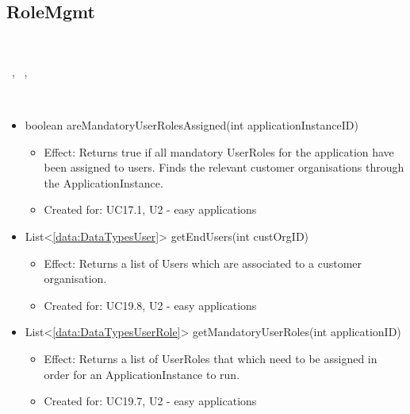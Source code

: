   \subsection{RoleMgmt}\label{int:OnlineServiceOnlineServiceUserManagerRoleMgmt}
    \begin{description}
      \item[Provided by:] \iconcomponent{}~
      \item[Required by:] \iconcomponent{}~, \iconcomponent{}~, \iconcomponent{}~
      \item[Operations:] ~
    \begin{itemize}[noitemsep,nolistsep,leftmargin=-.25cm]
      \item \textsf{boolean areMandatoryUserRolesAssigned(int applicationInstanceID)}
        \begin{itemize}[noitemsep,nolistsep]
           \item Effect: Returns true if all mandatory UserRoles for the application have been assigned to users. Finds the relevant customer organisations through the ApplicationInstance.
\item Created for: UC17.1, U2 - easy applications
        \end{itemize}
      \item \textsf{List\textless{}\ref{data:DataTypesUser}\textgreater{} getEndUsers(int custOrgID)}
        \begin{itemize}[noitemsep,nolistsep]
           \item Effect: Returns a list of Users which are associated to a customer organisation.
\item Created for: UC19.8, U2 - easy applications
        \end{itemize}
      \item \textsf{List\textless{}\ref{data:DataTypesUserRole}\textgreater{} getMandatoryUserRoles(int applicationID)}
        \begin{itemize}[noitemsep,nolistsep]
           \item Effect: Returns a list of UserRoles that which need to be assigned in order for an ApplicationInstance to run.
\item Created for: UC19.7, U2 - easy applications

\end{itemize}
\end{itemize}
\end{description}
